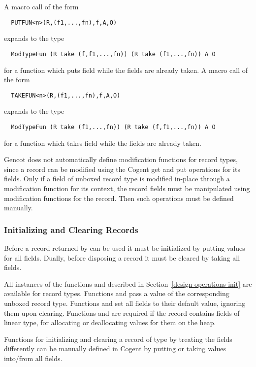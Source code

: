 A macro call of the form 
\begin{verbatim}
  PUTFUN<n>(R,(f1,...,fn),f,A,O)
\end{verbatim}
expands to the type
\begin{verbatim}
  ModTypeFun (R take (f,f1,...,fn)) (R take (f1,...,fn)) A O
\end{verbatim}
for a function which puts field  while the fields  are already taken. A macro call of the form
\begin{verbatim}
  TAKEFUN<n>(R,(f1,...,fn),f,A,O)
\end{verbatim}
expands to the type
\begin{verbatim}
  ModTypeFun (R take (f1,...,fn)) (R take (f,f1,...,fn)) A O
\end{verbatim}
for a function which takes field  while the fields  are already taken.

Gencot does not automatically define modification functions for record types, since a record can be modified using the
Cogent get and put operations for its fields. Only if a field of unboxed record type is modified in-place through a 
modification function for its context, the record fields
must be manipulated using modification functions for the record. Then such operations must be defined manually.

\subsubsection{Initializing and Clearing Records}

Before a record returned by  can be used it must be initialized by putting values for all fields. 
Dually, before disposing a record it must be cleared by taking all fields.

All instances of the functions  and  described in 
Section~\ref{design-operations-init} are available
for record types. Functions  and  pass a value of the corresponding
unboxed record type. Functions  and  set all fields to
their default value, ignoring them upon clearing. Functions  and  
are required if the record contains fields of linear type, for allocating or deallocating values for them on the heap.

Functions
for initializing and clearing a record  of type  by treating the fields differently can be manually 
defined in Cogent by putting or taking values into/from all fields.

